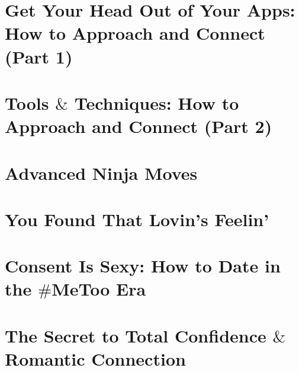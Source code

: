 \documentclass[11pt]{article}
\begin{document}
\section{Get Your Head Out of Your Apps: How to Approach and Connect (Part 1)}

\section{Tools $\&$ Techniques: How to Approach and Connect (Part 2)}

\section{Advanced Ninja Moves}

\section{You Found That Lovin's Feelin'}

\section{Consent Is Sexy: How to Date in the $\#$MeToo Era}

\section{The Secret to Total Confidence $\&$ Romantic Connection}

\newpage


\end{document}
